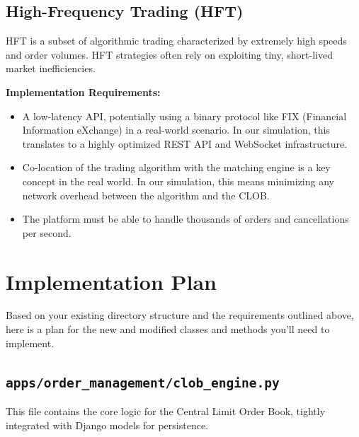 \documentclass[12pt]{article}
\begin{document}
\subsection{High-Frequency Trading (HFT)}

HFT is a subset of algorithmic trading characterized by extremely high speeds and order volumes. HFT strategies often rely on exploiting tiny, short-lived market inefficiencies.

\textbf{Implementation Requirements:}
\begin{itemize}
    \item A low-latency API, potentially using a binary protocol like FIX (Financial Information eXchange) in a real-world scenario. In our simulation, this translates to a highly optimized REST API and WebSocket infrastructure.
    \item Co-location of the trading algorithm with the matching engine is a key concept in the real world. In our simulation, this means minimizing any network overhead between the algorithm and the CLOB.
    \item The platform must be able to handle thousands of orders and cancellations per second.
\end{itemize}

\section{Implementation Plan}

Based on your existing directory structure and the requirements outlined above, here is a plan for the new and modified classes and methods you'll need to implement.

\subsection{\texttt{apps/order\_management/clob\_engine.py}}

This file contains the core logic for the Central Limit Order Book, tightly integrated with Django models for persistence.
\end{document}
